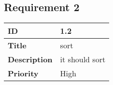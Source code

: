 \subsection{Requirement 2}

\begin{table}[H]
    \begin{tabularx}{\textwidth}{|l|l|}
        \textbf{ID} & 1.2 \\ \hline
        \textbf{Title} & sort \\ \hline
        \textbf{Description} & it should sort \\ \hline
        \textbf{Priority} & High \\\hline
    \end{tabularx}
\end{table}
